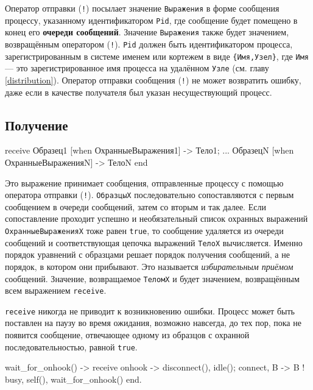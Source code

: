 Оператор отправки (\texttt{!}) посылает значение \texttt{Выражения} в форме 
сообщения процессу, указанному идентификатором \texttt{Pid}, где сообщение 
будет помещено в конец его \textbf{очереди сообщений}.  Значение
\texttt{Выражения} также будет значением, возвращённым оператором
(\texttt{!}).  \texttt{Pid} должен быть идентификатором процесса,
зарегистрированным в системе именем или кортежем в виде \texttt{\{Имя,Узел\}},
где \texttt{Имя} --- это зарегистрированное имя процесса на удалённом
\texttt{Узле} (см. главу \ref{distribution}). Оператор отправки сообщения 
(\texttt{!}) не может возвратить ошибку, даже если в качестве получателя был
указан несуществующий процесс.


\subsection{Получение}

\begin{erlangru}
receive
    Образец1 [when ОхранныеВыражения1] ->
        Тело1;
    ...
    ОбразецN [when ОхранныеВыраженияN] ->
        ТелоN      %
end
\end{erlangru}

Это выражение принимает сообщения, отправленные процессу с помощью оператора 
отправки (\texttt{!}). \texttt{ОбразцыX} последовательно сопоставляются с первым
сообщением в очереди сообщений, затем со вторым и так далее.  Если сопоставление
проходит успешно и необязательный список охранных выражений 
\texttt{ОхранныеВы\-раженияX} тоже равен \texttt{true}, то сообщение удаляется 
из очереди сообщений и соответствующая цепочка выражений \texttt{ТелоX} 
вычисляется. Именно порядок уравнений с образцами решает порядок получения
сообщений, а не  порядок, в котором они прибывают.  Это называется
\emph{избирательным приёмом} сообщений.  Значение, возвращаемое \texttt{ТеломX}
и будет значением, возвращённым всем выражением \texttt{receive}.

\texttt{receive} никогда не приводит к возникновению ошибки. Процесс может быть
поставлен на паузу во время ожидания, возможно навсегда, до тех пор, пока не 
появится сообщение, отвечающее одному из образцов с охранной 
последовательностью, равной \texttt{true}.

\newpage
\begin{erlang}
wait_for_onhook() ->
    receive
        onhook ->
            disconnect(),
            idle();
        {connect, B} ->
            B ! {busy, self()},
            wait_for_onhook()
    end.
\end{erlang}


